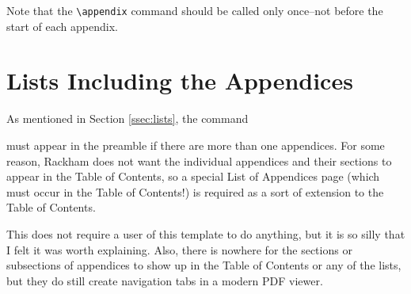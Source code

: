 \documentclass[thesis]{./tex/thesis-umich}
\begin{document}
Note that the \verb|\appendix| command should be called only
once--not before the start of each appendix.

\section{Lists Including the Appendices}
As mentioned in Section \ref{ssec:lists}, the command
\begin{code}
\showlistofappendices
\end{code}
must appear in the preamble if there are more than one appendices.  For
some reason, Rackham does not want the individual appendices and their
sections to appear in the Table of Contents, so a special List of
Appendices page (which must occur in the Table of Contents!) is required
as a sort of extension to the Table of Contents.

This does not require a user of this template to do anything, but it is
so silly that I felt it was worth explaining.  Also, there is nowhere
for the sections or subsections of appendices to show up in the Table of
Contents or any of the lists, but they do still create navigation tabs
in a modern PDF viewer.





\end{document}
